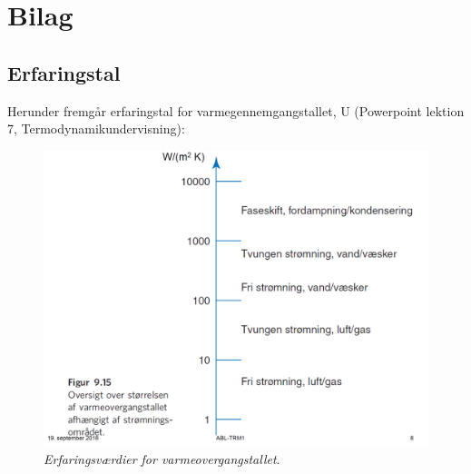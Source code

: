 \documentclass[Hovedrapport.tex]{subfiles}
\begin{document}
%
\setcounter{section}{0} 	    %
\chapter{Bilag}       
\label{chap:blg}
\vspace{-30pt}
\renewcommand{\thesection}{B\arabic{section}}
\newpage
\section{Erfaringstal}
    \label{sec:bil_erfaringstal_U}
Herunder fremgår erfaringstal for varmegennemgangstallet, U (Powerpoint lektion 7, Termodynamikundervisning):
\begin{figure}[H]
    \centering
    \includegraphics[width=1.0\textwidth]{Billeder/bil_erfaringstal_U.PNG}
    \caption{\textit{Erfaringsværdier for varmeovergangstallet}.}
    \label{fig:bil_erfaringstal_U}
\end{figure}
\end{document}
